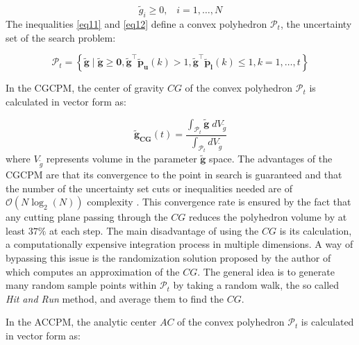 \documentclass[journal]{IEEEtran}
\begin{document}
\begin{equation}
\tilde{g}_{i}\geq0 ,\;\;\; i = 1, \ldots, N
\label{eq12}
\end{equation}
The inequalities \eqref{eq11} and \eqref{eq12} define a convex polyhedron $\mathcal{P}_{t}$, the uncertainty set of the search problem:

\begin{equation}
\mathcal{P}_{t}=\left\{\mathbf{\tilde{g}}\mid\mathbf{\tilde{g}}\geq\mathbf{0}, \mathbf{\tilde{g}^\intercal}\mathbf{\tilde{p}_{u}}(k) > 1, \mathbf{\tilde{g}^\intercal}\mathbf{\tilde{p}_{l}}(k) \leq 1,k = 1, \ldots, t\right\}
\label{eq13}
\end{equation}

In the CGCPM, the center of gravity $CG$ of the convex polyhedron $\mathcal{P}_{t}$ is calculated in vector form as:

\begin{equation}
\mathbf{\tilde{g}_{CG}}(t)=\frac{\int_{\mathcal{P}_{t}}\mathbf{\tilde{g}}\;dV_{\tilde{g}}}{\int_{\mathcal{P}_{t}}dV_{\tilde{g}}}
\label{eq14}
\end{equation}
where $V_{\tilde{g}}$ represents volume in the parameter $\mathbf{\tilde{g}}$ space. The advantages of the CGCPM are that its convergence to the point in search is guaranteed and that the number of the uncertainty set cuts or inequalities needed are of $\mathcal{O}(N\log_{2}(N))$ complexity \cite{biban86}. This convergence rate is ensured by the fact that any cutting plane passing through the $CG$ reduces the polyhedron volume by at least $37\%$ at each step. The main disadvantage of using the $CG$ is its calculation, a computationally expensive integration process in multiple dimensions. A way of bypassing this issue is the randomization solution proposed by the author of \cite{biban94} which computes an approximation of the $CG$. The general idea is to generate many random sample points within $\mathcal{P}_{t}$ by taking a random walk, the so called \textit{Hit and Run} method, and average them to find the $CG$.

In the ACCPM, the analytic center $AC$ of the convex polyhedron $\mathcal{P}_{t}$ is calculated in vector form as:
\end{document}
